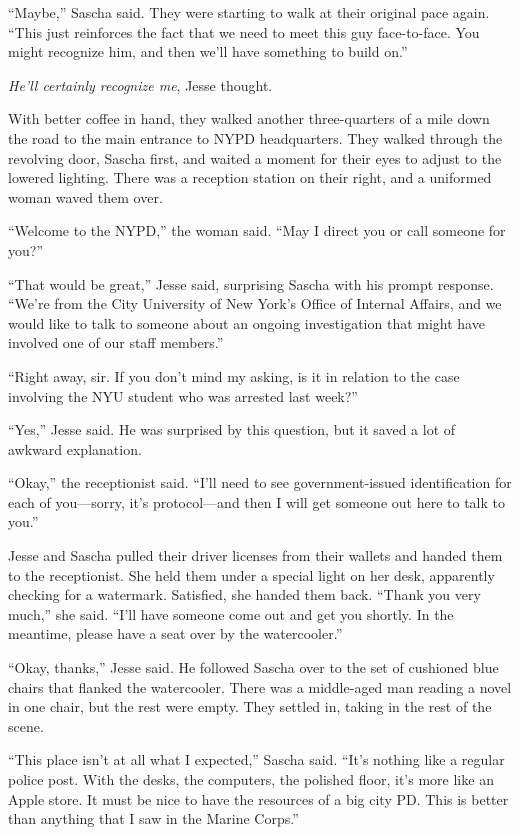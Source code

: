 \documentclass[12pt]{book}
\begin{document}
``Maybe,'' Sascha said.  They were starting to walk at their original pace again.  ``This just reinforces the fact that we need to meet this guy face-to-face.  You might recognize him, and then we'll have something to build on.''

\emph{He'll certainly recognize me}, Jesse thought.


With better coffee in hand, they walked another three-quarters of a mile down the road to the main entrance to NYPD headquarters.  They walked through the revolving door, Sascha first, and waited a moment for their eyes to adjust to the lowered lighting.  There was a reception station on their right, and a uniformed woman waved them over.

``Welcome to the NYPD,'' the woman said.  ``May I direct you or call someone for you?''

``That would be great,'' Jesse said, surprising Sascha with his prompt response.  ``We're from the City University of New York's Office of Internal Affairs, and we would like to talk to someone about an ongoing investigation that might have involved one of our staff members.''

``Right away, sir.  If you don't mind my asking, is it in relation to the case involving the NYU student who was arrested last week?''

``Yes,'' Jesse said.  He was surprised by this question, but it saved a lot of awkward explanation.

``Okay,'' the receptionist said.  ``I'll need to see government-issued identification for each of you---sorry, it's protocol---and then I will get someone out here to talk to you.''

Jesse and Sascha pulled their driver licenses from their wallets and handed them to the receptionist.  She held them under a special light on her desk, apparently checking for a watermark.  Satisfied, she handed them back.  ``Thank you very much,'' she said.  ``I'll have someone come out and get you shortly.  In the meantime, please have a seat over by the watercooler.''

``Okay, thanks,'' Jesse said.  He followed Sascha over to the set of cushioned blue chairs that flanked the watercooler.  There was a middle-aged man reading a novel in one chair, but the rest were empty.  They settled in, taking in the rest of the scene.

``This place isn't at all what I expected,'' Sascha said.  ``It's nothing like a regular police post.  With the desks, the computers, the polished floor, it's more like an Apple store.  It must be nice to have the resources of a big city PD.  This is better than anything that I saw in the Marine Corps.''
\end{document}
